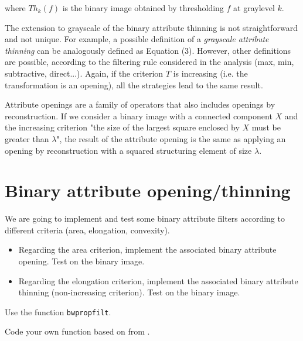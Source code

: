 \noindent where $Th_k(f)$ is the binary image obtained by thresholding $f$ at graylevel $k$.

The extension to grayscale of the binary attribute thinning is not straightforward and not unique. For example, a possible definition of a {\it grayscale attribute thinning} can be analogously defined as Equation (3). However, other definitions are possible, according to the filtering rule considered in the analysis (max, min, subtractive, direct...). Again, if the criterion $T$ is increasing (i.e. the transformation is an opening), all the strategies lead to the same result.

Attribute openings are a family of operators that also includes openings by reconstruction. If we consider a binary image with a connected component $X$ and the increasing criterion "the size of the largest square enclosed by $X$ must be greater than $\lambda$", the result of the attribute opening is the same as applying an opening by reconstruction with a squared structuring element of size $\lambda$.

\vspace*{-8pt}
\section{Binary attribute opening/thinning}
\vspace*{-6pt}
We are going to implement and test some binary attribute filters according to different criteria (area, elongation, convexity).
\begin{qbox}
\begin{itemize}
	\item Regarding the area criterion, implement the associated binary attribute opening. Test on the binary image.
	\item Regarding the elongation criterion, implement the associated binary attribute thinning (non-increasing criterion). Test on the binary image. 
\end{itemize}
\end{qbox}

\vspace*{-6pt}

\begin{mcomment}
\begin{mremark}
 Use the function \texttt{bwpropfilt}.
\end{mremark}
\end{mcomment}

\begin{pcomment}
\begin{premark}
 Code your own function  based on  from .
\end{premark}
\end{pcomment}



